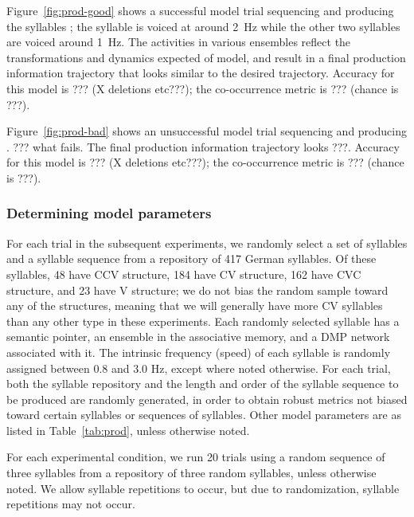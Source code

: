Figure~\ref{fig:prod-good} shows
a successful model trial
sequencing and producing the syllables
;
the \ipa{[ti]} syllable is voiced
at around 2~Hz while the other
two syllables are voiced around 1~Hz.
The activities in various ensembles
reflect the transformations
and dynamics expected of model,
and result in a final
production information trajectory
that looks similar
to the desired trajectory.
Accuracy for this model is ???
(X deletions etc???);
the co-occurrence metric is ???
(chance is ???).



Figure~\ref{fig:prod-bad}
shows an unsuccessful model trial
sequencing and producing
.
??? what fails.
The final production information trajectory
looks ???.
Accuracy for this model is ???
(X deletions etc???);
the co-occurrence metric is ???
(chance is ???).

\subsubsection{Determining model parameters}

For each trial in the subsequent experiments,
we randomly select a set of syllables
and a syllable sequence
from a repository of 417 German syllables.
Of these syllables,
48 have CCV structure,
184 have CV structure,
162 have CVC structure,
and 23 have V structure;
we do not bias the random sample
toward any of the structures,
meaning that we will generally
have more CV syllables
than any other type in these experiments.
Each randomly selected syllable
has a semantic pointer,
an ensemble in the associative memory,
and a DMP network associated with it.
The intrinsic frequency (speed)
of each syllable is randomly assigned
between 0.8 and 3.0 Hz,
except where noted otherwise.
For each trial,
both the syllable repository
and the length and order
of the syllable sequence
to be produced are randomly generated,
in order to obtain robust metrics
not biased toward certain syllables
or sequences of syllables.
Other model parameters are as listed in
Table~\ref{tab:prod},
unless otherwise noted.

For each experimental condition,
we run 20 trials using
a random sequence of three syllables
from a repository of three random syllables,
unless otherwise noted.
We allow syllable repetitions to occur,
but due to randomization,
syllable repetitions may not occur.


